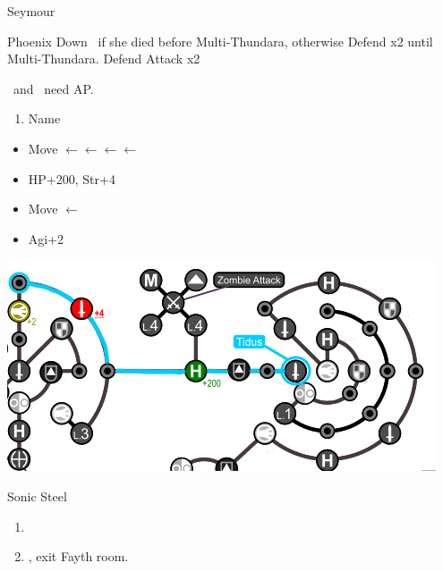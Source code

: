\begin{battle}[6000]{Seymour}
	\begin{itemize}
		\tidusf Phoenix Down \rikku\ if she died before Multi-Thundara, otherwise Defend x2 until Multi-Thundara. 
		\rikkuf Defend
		\tidusf Attack x2
	\end{itemize}
	\tidus\ and \yuna\ need AP.
\end{battle}
\begin{enumerate}[resume]
	\item Name \shiva
\end{enumerate}
\begin{spheregrid}
	\begin{itemize}
		\tidusf
		\begin{itemize}
			\item Move $\leftarrow\leftarrow\leftarrow\leftarrow$
			\item HP+200, Str+4
			\item Move $\leftarrow$
			\item Agi+2
		\end{itemize}
		\includegraphics[width=.8\columnwidth]{graphics/Tidus_Post_Seymour}
	\end{itemize}
\end{spheregrid}
\winvfill
\begin{equip}
	\begin{itemize}
		\tidusf Sonic Steel
	\end{itemize}
\end{equip}
\begin{enumerate}[resume]
	\item \formation{\rikku}{\tidus}{\yuna}
	\item \save, exit Fayth room.
\end{enumerate}
